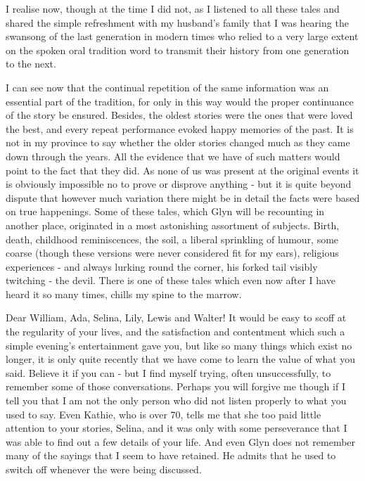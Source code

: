 I realise now, though at the time I did not, as I listened to all these tales and shared the simple refreshment with my husband's family that I was hearing the swansong of the last generation in modern times who relied to a very large extent on the spoken oral tradition word to transmit their history from one generation to the next.

I can see now that the continual repetition of the same information was an essential part of the tradition, for only in this way would the proper continuance of the story be ensured. Besides, the oldest stories were the ones that were loved the best, and every repeat performance evoked happy memories of the past. It is not in my province to say whether the older stories changed much as they came down through the years. All the evidence that we have of such matters would point to the fact that they did. As none of us was present at the original events it is obviously impossible no to prove or disprove anything - but it is quite beyond dispute that however much variation there might be in detail the facts were based on true happenings. Some of these tales, which Glyn will be recounting in another place, originated in a most astonishing assortment of subjects. Birth, death, childhood reminiscences, the soil, a liberal sprinkling of humour, some coarse (though these versions were never considered fit for my ears), religious experiences - and always lurking round the corner, his forked tail visibly twitching - the devil. There is one of these tales which even now after I have heard it so many times, chills my spine to the marrow.
 
Dear William, Ada, Selina, Lily, Lewis and Walter! It would be easy to scoff at the regularity of your lives, and the satisfaction and contentment which such a simple evening's entertainment gave you, but like so many things which exist no longer, it is only quite recently that we have come to learn the value of what you said. Believe it if you can - but I find myself trying, often unsuccessfully, to remember some of those conversations. Perhaps you will forgive me though if I tell you that I am not the only person who did not listen properly to what you used to say. Even Kathie, who is over 70, tells me that she too paid little attention to your stories, Selina, and it was only with some perseverance that I was able to find out a few details of your life. And even Glyn does not remember many of the sayings that I seem to have retained. He admits that he used to switch off whenever the  were being discussed.


